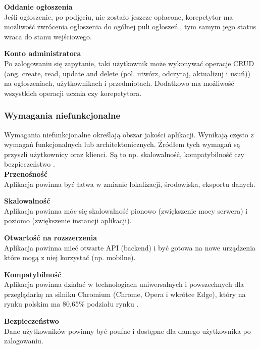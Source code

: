 \documentclass[12pt]{article}
\numberwithin{figure}{section}
\begin{document}
\begin{sloppypar}
\noindent
\textbf{Oddanie ogłoszenia}\\
\indent
Jeśli ogłoszenie, po podjęciu, nie zostało jeszcze opłacone, korepetytor ma możliwość zwrócenia ogłoszenia do ogólnej puli ogłoszeń., tym samym jego status wraca do stanu wejściowego. 

\noindent
\textbf{Konto administratora}\\
\indent
Po zalogowaniu się zapytanie, taki użytkownik może wykonywać operacje CRUD (ang. create, read, update and delete (pol. utwórz, odczytaj, aktualizuj i usuń)) na ogłoszeniach, użytkownikach i przedmiotach. Dodatkowo ma możliwość wszystkich operacji ucznia czy korepetytora.

\subsubsection{Wymagania niefunkcjonalne}

Wymagania niefunkcjonalne określają obszar jakości aplikacji. Wynikają często z wymagań funkcjonalnych lub architektonicznych. Źródłem tych wymagań są przyszli użytkownicy oraz klienci. Są to np. skalowalność, kompatybilność czy bezpieczeństwo \cite{niefunkcjonalne}.\\
\noindent
\textbf{Przenośność}\\
\indent
Aplikacja powinna być łatwa w zmianie lokalizacji, środowiska, eksportu danych.

\clearpage
\noindent
\textbf{Skalowalność}\\
\indent
Aplikacja powinna móc się skalowalność pionowo (zwiększenie mocy serwera) i poziomo (zwiększenie instancji aplikacji).

\noindent
\textbf{Otwartość na rozszerzenia}\\
\indent
Aplikacja powinna mieć otwarte API (backend) i być gotowa na nowe urządzenia które mogą z niej korzystać (np. mobilne).

\noindent
\textbf{Kompatybilność}\\
\indent
Aplikacja powinna działać w technologiach uniwersalnych i powszechnych dla przeglądarkę na silniku Chromium (Chrome, Opera i wkrótce Edge), który na rynku polskim ma 80,65\% podziału rynku \cite{chrome}.

\noindent
\textbf{Bezpieczeństwo}\\
\indent
Dane użytkowników powinny być poufne i dostępne dla danego użytkownika po zalogowaniu.


\end{sloppypar}
\end{document}
